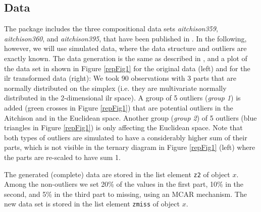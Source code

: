 \documentclass{scrartcl}\usepackage[]{graphicx}\usepackage[]{color}
\begin{document}
%
%
%
%

\subsection{Data}

The package includes the three compositional data sets \textit{aitchison359},
\textit{aitchison360}, and \textit{aitchison395}, that have been published
in \cite{Aitchison86}. In the following, however, we will use simulated data,
where the data structure and outliers are exactly known.
The data generation is the same as described in \cite{Hron09}, and
a plot of the data set in shown in Figure \ref{repFig1} for the original
data (left) and for the ilr transformed data (right): We took 90 
observations with 3 parts that are normally distributed on the simplex
(i.e. they are multivariate normally distributed in the 2-dimensional
ilr space). A group of 5 outliers (\textit{group 1}) 
is added (green crosses in Figure \ref{repFig1})
that are potential outliers in the Aitchison and in the Euclidean space.
Another group (\textit{group 2}) of 5 outliers (blue triangles in Figure \ref{repFig1})
is only affecting the Euclidean space. Note that both types of outliers are
simulated to have a considerably higher sum of their parts, which is not visible
in the ternary diagram \citep{Aitchison86} in Figure \ref{repFig1} (left) where the parts
are re-scaled to have sum 1.

The generated (complete) data are stored in the list element \texttt{z2}
of object $x$. Among the non-outliers we set 20\% of the values in the first
part, 10\% in the second, and 5\% in the third part to missing, using an
MCAR mechanism. The new data set is stored in the list element \texttt{zmiss} of object $x$.
\end{document}
